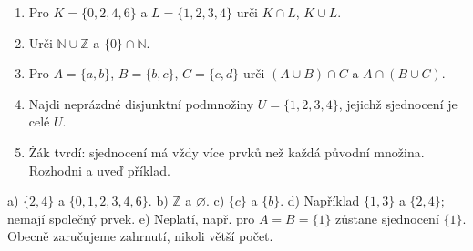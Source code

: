 \documentclass[11pt,a4paper]{article}
\begin{document}
\begin{zadaniReseniBox}[title={D1: 10–15 minut}]
\begin{enumerate}[label=\alph*)]
\item Pro $K=\{0,2,4,6\}$ a $L=\{1,2,3,4\}$ urči $K\cap L$, $K\cup L$.
\item Urči $\mathbb N\cup\mathbb Z$ a $\{0\}\cap\mathbb N$.
\item Pro $A=\{a,b\}$, $B=\{b,c\}$, $C=\{c,d\}$ urči
$(A\cup B)\cap C$ a $A\cap(B\cup C)$.
\item Najdi neprázdné disjunktní podmnožiny $U=\{1,2,3,4\}$,
jejichž sjednocení je celé $U$.
\item Žák tvrdí: sjednocení má vždy více prvků než každá původní množina.
Rozhodni a uveď příklad.
\end{enumerate}
\tcblower
a) $\{2,4\}$ a $\{0,1,2,3,4,6\}$.
b) $\mathbb Z$ a $\varnothing$.
c) $\{c\}$ a $\{b\}$.
d) Například $\{1,3\}$ a $\{2,4\}$; nemají společný prvek.
e) Neplatí, např. pro $A=B=\{1\}$ zůstane sjednocení $\{1\}$.
Obecně zaručujeme zahrnutí, nikoli větší počet.
\end{zadaniReseniBox}
\end{document}
